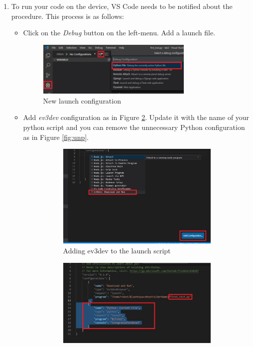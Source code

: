 \documentclass{scrartcl}
\begin{document}
\begin{enumerate}
    \item To run your code on the device, VS Code needs to be notified about the procedure. This process is as follows:
    \begin{itemize}
        \item Click on the \textit{Debug} button on the left-menu. Add a launch file.
            \begin{figure}[h!]
                \begin{center}
                  \includegraphics[width=0.75\textwidth]{r1.jpg}
                  \caption{New launch configuration}
                  \label{fig:nlc}
                \end{center}
            \end{figure}
        \item Add \textit{ev3dev} configuration as in Figure \ref{fig:ev3c}. Update it with the name of your python script and you can remove the unnecessary Python configuration as in Figure \ref{fig:unp}.
            \begin{figure}
                \centering
                \begin{subfigure}{.5\textwidth}
                  \centering
                  \includegraphics[width=.75\linewidth]{r2.jpg}
                  \caption{Adding ev3dev to the launch script}
                  \label{fig:ev3c}
                \end{subfigure}%
                \begin{subfigure}{.5\textwidth}
                  \centering
                  \includegraphics[width=.85\linewidth]{r3.jpg}

\end{subfigure}
\end{figure}
\end{itemize}
\end{enumerate}
\end{document}
